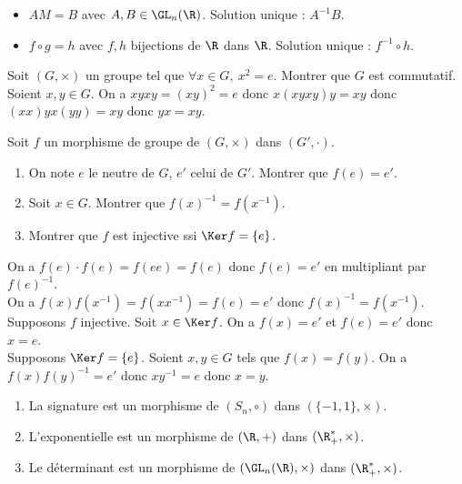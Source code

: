 \documentclass[11pt]{article}
\begin{document}
\begin{ex}{}{}
    \begin{itemize}
        \item $AM=B$ avec $A,B\in\GL_n(\R)$. Solution unique : $A^{-1}B$.
        \item $f\circ g = h$ avec $f,h$ bijections de $\R$ dans $\R$. Solution unique : $f^{-1}\circ h$.
    \end{itemize}
\end{ex}

\vspace*{-0.7cm}

\begin{exi}{}{}
    Soit $(G,\times)$ un groupe tel que $\forall x \in G, ~ x^2=e$. Montrer que $G$ est commutatif.
    \tcblower
    Soient $x,y\in G$. On a $xyxy=(xy)^2=e$ donc $x(xyxy)y=xy$ donc $(xx)yx(yy)=xy$ donc $yx=xy$.
\end{exi}

\vspace*{-0.7cm}

\begin{ex}{}{}
    Soit $f$ un morphisme de groupe de $(G,\times)$ dans $(G',\cdot)$.
    \begin{enumerate}
        \item On note $e$ le neutre de $G$, $e'$ celui de $G'$. Montrer que $f(e)=e'$.
        \item Soit $x\in G$. Montrer que $f(x)^{-1}=f(x^{-1})$.
        \item Montrer que $f$ est injective ssi $\Ker f = \{e\}$.
    \end{enumerate}
    \tcblower
     On a $f(e)\cdot f(e)=f(ee)=f(e)$ donc $f(e)=e'$ en multipliant par $f(e)^{-1}$.\\
     On a $f(x)f(x^{-1})=f(xx^{-1})=f(e)=e'$ donc $f(x)^{-1}=f(x^{-1})$.\\
     Supposons $f$ injective. Soit $x\in\Ker f$. On a $f(x)=e'$ et $f(e)=e'$ donc $x=e$.\\
    Supposons $\Ker f=\{e\}$. Soient $x,y\in G$ tels que $f(x)=f(y)$. On a $f(x)f(y)^{-1}=e'$ donc $xy^{-1}=e$ donc $x=y$.
\end{ex}

\vspace*{-0.7cm}

\begin{ex}{}{}
    \begin{enumerate}
        \item La signature est un morphisme de $(S_n,\circ)$ dans $(\{-1,1\},\times)$.
        \item L'exponentielle est un morphisme de $(\R,+)$ dans $(\R^*_+,\times)$.
        \item Le déterminant est un morphisme de $(\GL_n(\R),\times)$ dans $(\R^*_+,\times)$.
    \end{enumerate}
\end{ex}
\end{document}
